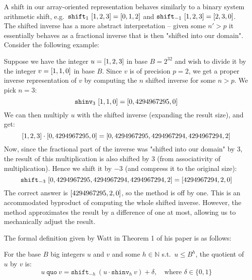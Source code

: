 A shift in our array-oriented representation behaves similarly to a binary
system arithmetic shift, e.g.\ $\mathtt{shift}_1~\mathtt{[}1,2,3\mathtt{]} = \mathtt{[}0,1,2\mathtt{]}$ and
$\mathtt{shift}_{-1}~\mathtt{[}1,2,3\mathtt{]} = \mathtt{[}2,3,0\mathtt{]}$. The shifted inverse has a more
abstract interpretation -- given some $n'>p$ it essentially behaves as a
fractional inverse that is then "shifted into our domain". Consider the
following example:

\begin{example}
Suppose we have the integer $u=\mathtt{[}1,2,3\mathtt{]}$ in base $B=2^{32}$ and wish to divide
it by the integer $v=\mathtt{[}1,1,0\mathtt{]}$ in base $B$. Since $v$ is of precision $p=2$,
we get a proper inverse representation of $v$ by computing the $n$ shifted
inverse for some $n>p$. We pick $n=3$:
\begin{equation}
\label{eq:3}
\mathtt{shinv}_3~\mathtt{[}1,1,0\mathtt{]} = \mathtt{[}0,4294967295,0\mathtt{]}
\end{equation}
We can then multiply $u$ with the shifted inverse (expanding the result size),
and get:
\begin{equation}
  \label{eq:4}
  \mathtt{[}1,2,3\mathtt{]}\cdot\mathtt{[}0,4294967295,0\mathtt{]} = \mathtt{[}0,4294967295,4294967294,4294967294,2\mathtt{]}
\end{equation}
Now, since the fractional part of the inverse was "shifted into our domain" by
3, the result of this multiplication is also shifted by 3 (from associativity of
multiplication). Hence we shift it by $-3$ (and compress it to the original
size):
\begin{equation}
  \label{eq:5}
  \mathtt{shift}_{-3}~\mathtt{[}0,4294967295,4294967294,4294967294,2\mathtt{]} = \mathtt{[}4294967294,2,0\mathtt{]}
\end{equation}
The correct answer is $\mathtt{[}4294967295,2,0\mathtt{]}$, so the method is off by one. This
is an accommodated byproduct of computing the whole shifted inverse. However,
the method approximates the result by a difference of one at most, allowing us
to mechanically adjust the result.\newline
\end{example}

The formal definition given by Watt in Theorem 1 of his paper
\cite{watt2023efficient} is as follows:

\begin{definition}\label{def:quo}
  For the base $B$ big integers $u$ and $v$ and some $h\in \mathbb{N}$ s.t.\
  $u \leq B^h$, the quotient of $u$ by $v$ is:
  \begin{equation}
    \label{eq:defquo}
    u~\mathtt{quo}~v = \mathtt{shift}_{-h}~ (u \cdot \mathtt{shinv}_h~v) + \delta,\quad \text{where~} \delta \in \{0,1\}
  \end{equation}
\end{definition}

